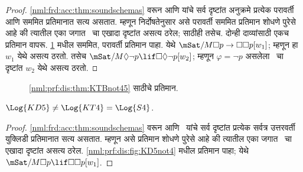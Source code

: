 \begin{proof}
  \ref{nml:frd:acc:thm:soundschemas} वरून
   आणि  यांचे सर्व दृष्टांत
  अनुक्रमे प्रत्येक परावर्ती आणि सममित प्रतिमानात
  सत्य असतात. म्हणून निर्दोषतेनुसार असे
  परावर्ती सममित प्रतिमान शोधणे पुरेसे आहे की
  त्यातील एका जगात~ चा एखादा दृष्टांत
  असत्य ठरेल;  साठीही तसेच.
  दोन्ही दाव्यांसाठी एकच प्रतिमान वापरू.
  \ref{nml:prf:dis:fig:KTBnot45} मधील सममित, परावर्ती
  प्रतिमान पाहा. येथे $\mSat/{M}{\Box p \to \Box \Box
    p}[w_1]$; म्हणून  हा $w_1$ येथे
  असत्य ठरतो. तसेच $\mSat/{M}{\Diamond
    \lnot p \lif \Box \Diamond \lnot p}[w_2]$;
  म्हणून $\varphi = \lnot p$ असलेला~ चा
  दृष्टांत $w_2$ येथे असत्य ठरतो.
\end{proof}

\begin{figure}[htpb]
  \centering
  \caption{\ref{nml:prf:dis:thm:KTBnot45} साठीचे प्रतिमान.}
  \label{nml:prf:dis:fig:KTBnot45}
\end{figure}

\begin{thm}\label{nml:prf:dis:thm:KD5not4}
  $\Log{KD5} \neq \Log{KT4} = \Log{S4}$.
\end{thm}

\begin{proof}
  \ref{nml:frd:acc:thm:soundschemas} वरून
   आणि~ यांचे सर्व दृष्टांत
  प्रत्येक सर्वत्र उत्तरवर्ती युक्लिडी प्रतिमानात
  सत्य असतात. म्हणून असे प्रतिमान शोधणे पुरेसे
  आहे की त्यातील एका जगात~ चा एखादा
  दृष्टांत असत्य ठरेल. \ref{nml:prf:dis:fig:KD5not4}
  मधील प्रतिमान पाहा; येथे
  $\mSat/{M}{\Box p
  \lif \Box\Box p}[w_1]$.
\end{proof}

